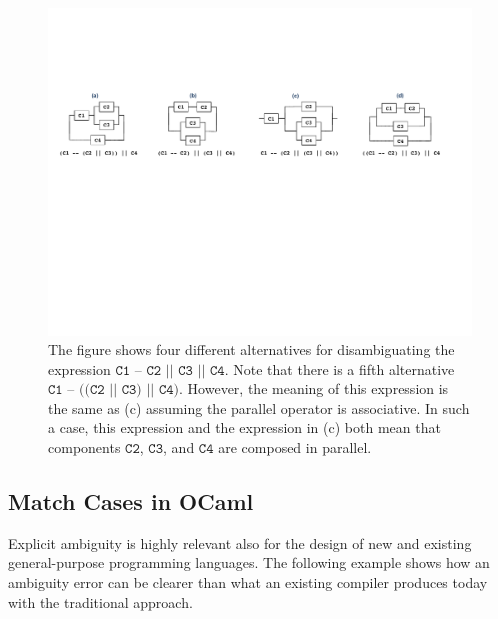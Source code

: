 \documentclass[runningheads]{llncs}
\begin{document}
\begin{figure}[!t]
\center
\includegraphics[width=1.0\textwidth]{circuits.pdf}
\caption{The figure shows four different alternatives for disambiguating the expression $\texttt{C1 -- C2 || C3 || C4}$. Note that there is a fifth alternative $\texttt{C1 -- ((C2 || C3) || C4)}$. However, the meaning of this expression is the same as (c) assuming the parallel operator is associative. In such a case, this expression and the expression in (c) both mean that components $\texttt{C2}$, $\texttt{C3}$, and $\texttt{C4}$ are composed in parallel. }
\label{fig:circuits}
\end{figure}



\subsection{Match Cases in OCaml}

Explicit ambiguity is highly relevant also for the design of new and existing general-purpose programming languages. The following example shows how an ambiguity error can be clearer than what an existing compiler produces today with the traditional approach.


\end{document}
